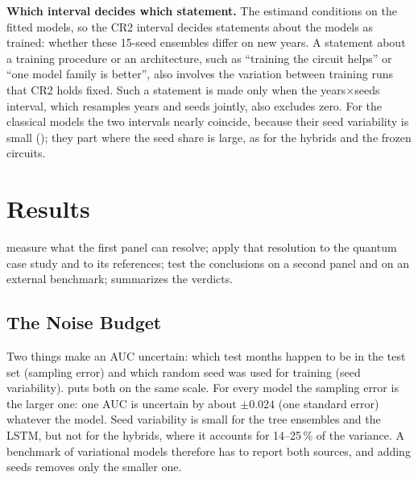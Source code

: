 \documentclass[11pt,a4paper]{article}
\begin{document}
\textbf{Which interval decides which statement.} The estimand conditions on the fitted models, so the CR2 interval decides statements about the models as trained: whether these 15-seed ensembles differ on new years. A statement about a training procedure or an architecture, such as ``training the circuit helps'' or ``one model family is better'', also involves the variation between training runs that CR2 holds fixed. Such a statement is made only when the years$\times$seeds interval, which resamples years and seeds jointly, also excludes zero. For the classical models the two intervals nearly coincide, because their seed variability is small (); they part where the seed share is large, as for the hybrids and the frozen circuits.

\section{Results}

 measure what the first panel can resolve;  apply that resolution to the quantum case study and to its references;  test the conclusions on a second panel and on an external benchmark;  summarizes the verdicts.

\subsection{The Noise Budget}
\label{sec:budget}

Two things make an AUC uncertain: which test months happen to be in the test set (sampling error) and which random seed was used for training (seed variability).  puts both on the same scale. For every model the sampling error is the larger one: one AUC is uncertain by about $\pm0.024$ (one standard error) whatever the model. Seed variability is small for the tree ensembles and the LSTM, but not for the hybrids, where it accounts for 14--25\,\% of the variance. A benchmark of variational models therefore has to report both sources, and adding seeds removes only the smaller one.
\end{document}
